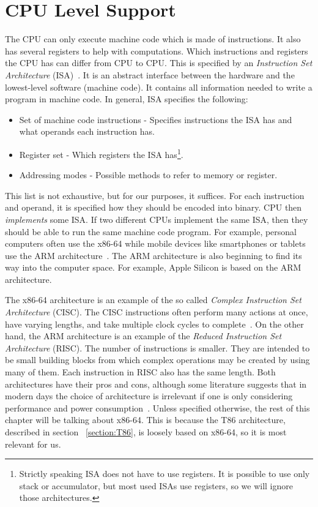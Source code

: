 \section{CPU Level Support}\label{section:cpu-debug-support}
The CPU can only execute machine code which is made of instructions. It also
has several registers to help with computations. Which instructions and
registers the CPU has can differ from CPU to CPU. This is specified by an
\textit{Instruction Set Architecture} (ISA)~\cite{isa}. It is an abstract
interface between the hardware and the lowest-level software (machine code). It
contains all information needed to write a program in machine code. In general,
ISA specifies the following: 
\begin{itemize}
    \item Set of machine code instructions - Specifies instructions the ISA has
        and what operands each instruction has.
    \item Register set - Which registers the ISA has\footnote{Strictly speaking
        ISA does not have to use registers. It is possible to use only stack or
        accumulator, but most used ISAs use registers, so we will ignore those
        architectures. }.   
    \item Addressing modes - Possible methods to refer to memory or register. 
\end{itemize}
This list is not exhaustive, but for our purposes, it suffices. For each
instruction and operand, it is specified how they should be encoded into
binary. CPU then \textit{implements} some ISA. If two different CPUs implement
the same ISA, then they should be able to run the same machine code program.
For example, personal computers often use the x86-64 while mobile devices like
smartphones or tablets use the ARM architecture~\cite{riscvscisc2}. The ARM
architecture is also beginning to find its way into the computer space. For
example, Apple Silicon is based on the ARM architecture.

The x86-64 architecture is an example of the so called \textit{Complex
Instruction Set Architecture} (CISC). The CISC instructions often perform many
actions at once, have varying lengths, and take multiple clock cycles to
complete~\cite{intel-manual}. On the other hand, the ARM architecture is
an example of the \textit{Reduced Instruction Set Architecture} (RISC). The
number of instructions is smaller. They are intended to be small building
blocks from which complex operations may be created by using many of them. Each
instruction in RISC also has the same length. Both architectures have their
pros and cons, although some literature suggests that in modern days the choice
of architecture is irrelevant if one is only considering performance and power
consumption~\cite{riscvscisc1, riscvscisc2}. Unless specified otherwise, the
rest of this chapter will be talking about x86-64. This is because the T86
architecture, described in section ~\ref{section:T86}, is loosely based on
x86-64, so it is most relevant for us.

